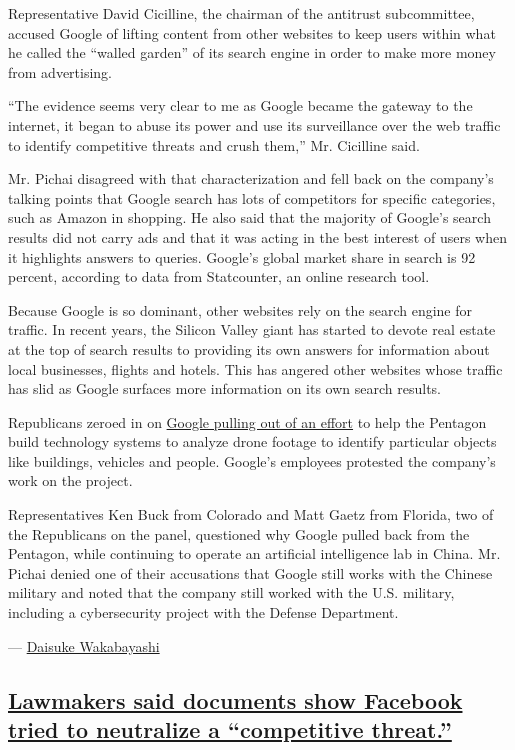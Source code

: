 Representative David Cicilline, the chairman of the antitrust
subcommittee, accused Google of lifting content from other websites to
keep users within what he called the ``walled garden'' of its search
engine in order to make more money from advertising.

``The evidence seems very clear to me as Google became the gateway to
the internet, it began to abuse its power and use its surveillance over
the web traffic to identify competitive threats and crush them,'' Mr.
Cicilline said.

Mr. Pichai disagreed with that characterization and fell back on the
company's talking points that Google search has lots of competitors for
specific categories, such as Amazon in shopping. He also said that the
majority of Google's search results did not carry ads and that it was
acting in the best interest of users when it highlights answers to
queries. Google's global market share in search is 92 percent, according
to data from Statcounter, an online research tool.

Because Google is so dominant, other websites rely on the search engine
for traffic. In recent years, the Silicon Valley giant has started to
devote real estate at the top of search results to providing its own
answers for information about local businesses, flights and hotels. This
has angered other websites whose traffic has slid as Google surfaces
more information on its own search results.

Republicans zeroed in on
\href{https://slack-redir.net/link?url=https\%3A\%2F\%2Fwww.nytimes.com\%2F2018\%2F06\%2F01\%2Ftechnology\%2Fgoogle-pentagon-project-maven.html}{Google
pulling out of an effort} to help the Pentagon build technology systems
to analyze drone footage to identify particular objects like buildings,
vehicles and people. Google's employees protested the company's work on
the project.

Representatives Ken Buck from Colorado and Matt Gaetz from Florida, two
of the Republicans on the panel, questioned why Google pulled back from
the Pentagon, while continuing to operate an artificial intelligence lab
in China. Mr. Pichai denied one of their accusations that Google still
works with the Chinese military and noted that the company still worked
with the U.S. military, including a cybersecurity project with the
Defense Department.

--- \href{https://www.nytimes.com/by/daisuke-wakabayashi}{Daisuke
Wakabayashi}

\hypertarget{lawmakers-said-documents-show-facebook-tried-to-neutralize-a-competitive-threat}{%
\subsection{\texorpdfstring{\protect\hyperlink{lawmakers-said-documents-show-facebook-tried-to-neutralize-a-competitive-threat}{Lawmakers
said documents show Facebook tried to neutralize a ``competitive
threat.''}}{Lawmakers said documents show Facebook tried to neutralize a ``competitive threat.''}}\label{lawmakers-said-documents-show-facebook-tried-to-neutralize-a-competitive-threat}}

